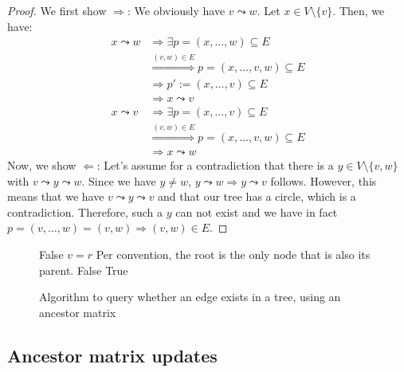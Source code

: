 \begin{proof}

We first show $\Rightarrow$: We obviously have $v \leadsto w$. Let $x \in V \setminus \{v\}$. Then, we have:
\begin{align*}
    x \leadsto w    &\Rightarrow \exists p = (x, \dots, w) \subseteq E \\
                    &\stackrel{(v, w) \in E}{\Rightarrow} p = (x, \dots, v, w) \subseteq E \\
                    &\Rightarrow p' := (x, \dots, v) \subseteq E \\
                    &\Rightarrow x \leadsto v \\
    x \leadsto v    &\Rightarrow \exists p = (x, \dots, v) \subseteq E \\
                    &\stackrel{(v, w) \in E}{\Rightarrow} p = (x, \dots, v, w) \subseteq E \\
                    &\Rightarrow x \leadsto w
\end{align*}
Now, we show $\Leftarrow$: Let's assume for a contradiction that there is a $y \in V \setminus \{v, w\}$ with $v \leadsto y \leadsto w$. Since we have $y \neq w$, $y \leadsto w \Rightarrow y \leadsto v$ follows. However, this means that we have $v \leadsto y \leadsto v$ and that our tree has a circle, which is a contradiction. Therefore, such a $y$ can not exist and we have in fact $p = (v, \dots, w) = (v, w) \Rightarrow (v, w) \in E$.
\end{proof}

\begin{figure}[p]
    \begin{algorithmic}[1]
                \State \Return False
            \EndIf
                \State \Return $v = r$ \Comment Per convention, the root is the only node that is also its parent.
            \EndIf
                    \State \Return False
                \EndIf
            \EndFor
            \State \Return True
        \EndFunction
    \end{algorithmic}
    \caption{Algorithm to query whether an edge exists in a tree, using an ancestor matrix}
    \label{alg:is_parent}
\end{figure}

\subsection{Ancestor matrix updates}

